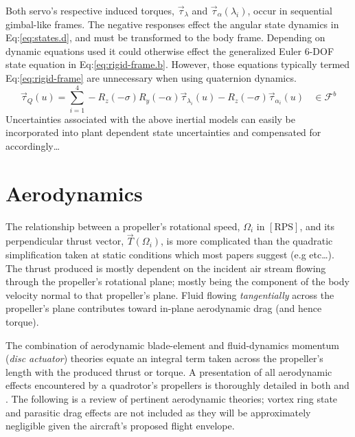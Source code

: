 \par
Both servo's respective induced torques, $\vec{\tau}_\lambda$ and $\vec{\tau}_\alpha(\lambda_i)$, occur in sequential gimbal-like frames. The negative responses effect the angular state dynamics in Eq:\ref{eq:states.d}, and must be transformed to the body frame. Depending on dynamic equations used it could otherwise effect the generalized Euler 6-DOF state equation in Eq:\ref{eq:rigid-frame.b}. However, those equations typically termed Eq:\ref{eq:rigid-frame} are unnecessary when using quaternion dynamics.
\begin{equation}\label{eq:torque-response}
\vec{\tau}_Q(u)=\sum_{i=1}^4 -R_z(-\sigma)R_y(-\alpha)\vec{\tau}_{\lambda_i}(u)-R_z(-\sigma)\vec{\tau}_{\alpha_i}(u)~~~~\in\mathcal{F}^b
\end{equation}
Uncertainties associated with the above inertial models can easily be incorporated into plant dependent state uncertainties and compensated for accordingly\ldots
\section{Aerodynamics}
\label{sec:dynamics.aero}
The relationship between a propeller's rotational speed, $\Omega_i$ in $[\text{RPS}]$, and its perpendicular thrust vector, $\vec{T}(\Omega_i)$, is more complicated than the quadratic simplification taken at static conditions which most papers suggest (e.g \cite{x4flyer,modelingquadcopter} etc\ldots). The thrust produced is mostly dependent on the incident air stream flowing through the propeller's rotational plane; mostly being the component of the body velocity normal to that propeller's plane. Fluid flowing \emph{tangentially} across the propeller's plane contributes toward in-plane aerodynamic drag (and hence torque). 
\par
The combination of aerodynamic blade-element\cite{bem,forwarddescent} and fluid-dynamics momentum (\emph{disc actuator}) theories equate an integral term taken across the propeller's length with the produced thrust or torque. A presentation of all aerodynamic effects encountered by a quadrotor's propellers is thoroughly detailed in both \cite{bladesforquadrotors} and \cite{nonlineardynamics}. The following is a review of pertinent aerodynamic theories; vortex ring state and parasitic drag effects are not included as they will be approximately negligible given the aircraft's proposed flight envelope.
